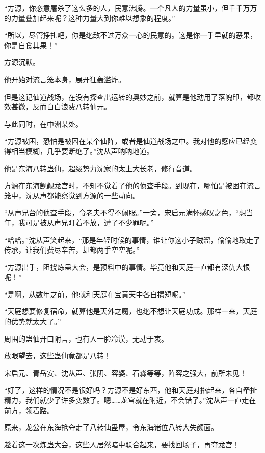 \begin{this_body}
“方源，你恣意屠杀了这么多的人，民意沸腾。一个凡人的力量虽小，但千千万万的力量叠加起来呢？这种力量大到你难以想象的程度。”

“所以，尽管挣扎吧，你是绝敌不过万众一心的民意的。这是你一手早就的恶果，你是自食其果！”

方源沉默。

他开始对流言笼本身，展开狂轰滥炸。

但是这记仙道战场，在没有探查出运转的奥妙之前，就算是他动用了落魄印，都收效甚微，反而白白浪费八转仙元。

与此同时，在中洲某处。

“方源被困，恐怕是被困在某个仙阵，或者是仙道战场之中。我对他的感应已经变得相当模糊，几乎要断绝了。”沈从声呐呐地道。

他是东海八转蛊仙，超级势力沈家的太上大长老，修行音道。

方源在东海觊觎龙宫时，不知不觉着了他的侦查手段。到现在，哪怕是被困在流言笼中，沈从声都能察觉到方源的一些动向。

“从声兄台的侦查手段，令老夫不得不佩服。”一旁，宋启元满怀感叹之色，“想当年，我可是被从声兄盯着不放，遭了不少罪呢。”

“哈哈。”沈从声笑起来，“那是年轻时候的事情，谁让你这小子贼溜，偷偷地取走了传承，让我们费尽辛苦，却都两手空空呢。”

“方源出手，阻挠炼蛊大会，是预料中的事情。毕竟他和天庭一直都有深仇大恨呢！”

“是啊，从数年之前，他就和天庭在宝黄天中各自揭短呢。”

“天庭想要修复宿命，就算他是天外之魔，也绝不想让天庭功成。那样一来，天庭的优势就太大了。”

周围的蛊仙开口附言，也有人一脸冷漠，无动于衷。

放眼望去，这些蛊仙竟都是八转！

宋启元、青岳安、沈从声、张阴、容婆、石淼等等，阵容之强大，前所未见！

“好了，这样的情况不是很好吗？方源不是好东西，他和天庭对掐起来，各自牵扯精力，我们就少了许多变数了。嗯……龙宫就在附近，不会错了。”沈从声一直走在前方，领着路。

原来，龙公在东海抢夺走了八转仙蛊屋，令东海诸位八转大失颜面。

趁着这一次炼蛊大会，这些人居然暗中联合起来，要找回场子，再夺龙宫！

\end{this_body}

